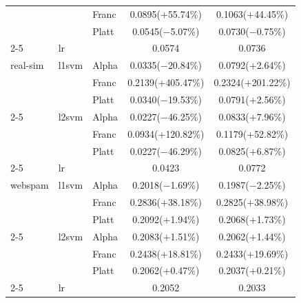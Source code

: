 \begin{tabular}{@{}lllcc@{}}
 &  & Franc & 0.0895($+$55.74\%) & 0.1063($+$44.45\%) \\
 &  & Platt & 0.0545($-$5.07\%) & 0.0730($-$0.75\%) \\
\cline{2-5}
 & lr &  & 0.0574 & 0.0736 \\
\hline
real-sim & l1svm & Alpha & 0.0335($-$20.84\%) & 0.0792($+$2.64\%) \\
 &  & Franc & 0.2139($+$405.47\%) & 0.2324($+$201.22\%) \\
 &  & Platt & 0.0340($-$19.53\%) & 0.0791($+$2.56\%) \\
\cline{2-5}
 & l2svm & Alpha & 0.0227($-$46.25\%) & 0.0833($+$7.96\%) \\
 &  & Franc & 0.0934($+$120.82\%) & 0.1179($+$52.82\%) \\
 &  & Platt & 0.0227($-$46.29\%) & 0.0825($+$6.87\%) \\
\cline{2-5}
 & lr &  & 0.0423 & 0.0772 \\
\hline
webspam & l1svm & Alpha & 0.2018($-$1.69\%) & 0.1987($-$2.25\%) \\
 &  & Franc & 0.2836($+$38.18\%) & 0.2825($+$38.98\%) \\
 &  & Platt & 0.2092($+$1.94\%) & 0.2068($+$1.73\%) \\
\cline{2-5}
 & l2svm & Alpha & 0.2083($+$1.51\%) & 0.2062($+$1.44\%) \\
 &  & Franc & 0.2438($+$18.81\%) & 0.2433($+$19.69\%) \\
 &  & Platt & 0.2062($+$0.47\%) & 0.2037($+$0.21\%) \\
\cline{2-5}
 & lr &  & 0.2052 & 0.2033 \\
\hline
\end{tabular}